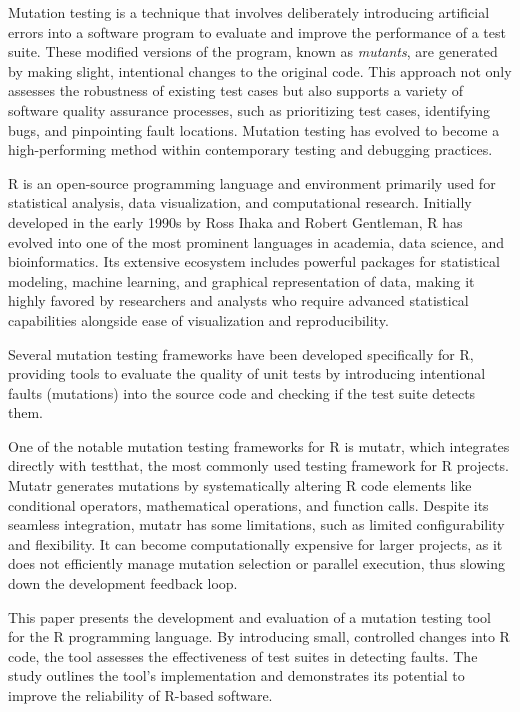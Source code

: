 \begin{chapterabstract}
\end{chapterabstract}

Mutation testing is a technique that involves deliberately introducing artificial errors into a software program to evaluate and improve the performance of a test suite. These modified versions of the program, known as 
\textit{mutants}, are generated by making slight, intentional changes to the original code. This approach not only assesses the robustness of existing test cases but also supports a variety of software quality assurance 
processes, such as prioritizing test cases, identifying bugs, and pinpointing fault locations. Mutation testing has evolved to become a high-performing method within contemporary testing and debugging practices.

R\cite{R-base} is an open-source programming language and environment primarily used for statistical analysis, data visualization, and computational research. Initially developed in the early 1990s by Ross Ihaka and Robert 
Gentleman, R has evolved into one of the most prominent languages in academia, data science, and bioinformatics. Its extensive ecosystem includes powerful packages for statistical modeling, machine learning, and graphical 
representation of data, making it highly favored by researchers and analysts who require advanced statistical capabilities alongside ease of visualization and reproducibility.

Several mutation testing frameworks have been developed specifically for R, providing tools to evaluate the quality of unit tests by introducing intentional faults (mutations) into the source code and checking if the test 
suite detects them.

One of the notable mutation testing frameworks for R is mutatr, which integrates directly with testthat\cite{wickham2011testthat}, the most commonly used testing framework for R projects. Mutatr\cite{wickham_mutatr} 
generates mutations by systematically altering R code elements like conditional operators, mathematical operations, and function calls. Despite its seamless integration, mutatr has some limitations, such as limited 
configurability and flexibility. It can become computationally expensive for larger projects, as it does not efficiently manage mutation selection or parallel execution, thus slowing down the development feedback loop.

This paper presents the development and evaluation of a mutation testing tool for the R programming language. By introducing small, controlled changes into R code, the tool assesses the effectiveness of test suites in 
detecting faults. The study outlines the tool’s implementation and demonstrates its potential to improve the reliability of R-based software.